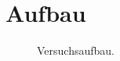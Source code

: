 \section{Aufbau}
\label{sec:Aufbau}


\begin{figure}
\centering
\caption{Versuchsaufbau.}
\label{fig:aufbau}
\end{figure}